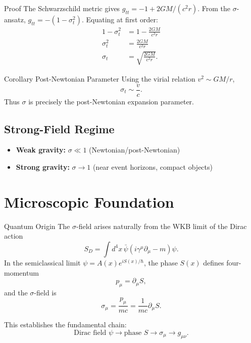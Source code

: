 \documentclass[11pt,a4paper]{article}
\theoremstyle{definition}
\theoremstyle{remark}
\begin{document}
	Proof
		The Schwarzschild metric gives $g_{tt} = -1 + 2GM/(c^2r)$. From the $\sigma$-ansatz, $g_{tt} = -(1 - \sigma_t^2)$. Equating at first order:
		\begin{align}
			1 - \sigma_t^2 &= 1 - \frac{2GM}{c^2 r}\\
			\sigma_t^2 &= \frac{2GM}{c^2 r}\\
			\sigma_t &= \sqrt{\frac{2GM}{c^2 r}}.
		\end{align}
	
	Corollary Post-Newtonian Parameter
		Using the virial relation $v^2 \sim GM/r$,
		\begin{equation}
			\sigma_t \sim \frac{v}{c}.
		\end{equation}
		Thus $\sigma$ is precisely the post-Newtonian expansion parameter.
	
	\subsection{Strong-Field Regime}
	
	\begin{itemize}
		\item \textbf{Weak gravity:} $\sigma \ll 1$ (Newtonian/post-Newtonian)
		\item \textbf{Strong gravity:} $\sigma \to 1$ (near event horizons, compact objects)
	\end{itemize}
	
	\section{Microscopic Foundation}
	
	Quantum Origin
		The $\sigma$-field arises naturally from the WKB limit of the Dirac action
		\begin{equation}
			S_D = \int d^4x \, \bar\psi(i\gamma^\mu \partial_\mu - m)\psi.
		\end{equation}
		In the semiclassical limit $\psi = A(x) e^{iS(x)/\hbar}$, the phase $S(x)$ defines four-momentum
		\begin{equation}
			p_\mu = \partial_\mu S,
		\end{equation}
		and the $\sigma$-field is
		\begin{equation}
			\boxed{\sigma_\mu = \frac{p_\mu}{mc} = \frac{1}{mc} \partial_\mu S.}
		\end{equation}
	
	This establishes the fundamental chain:
	\begin{equation}
		\text{Dirac field } \psi \longrightarrow \text{phase } S \longrightarrow \sigma_\mu \longrightarrow g_{\mu\nu}.
	\end{equation}
	
\end{document}

